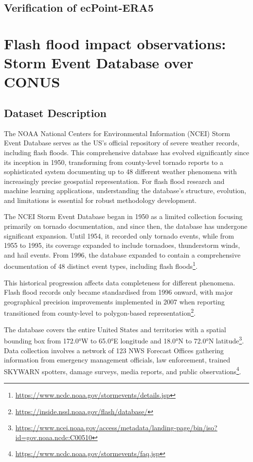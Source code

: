 \subsection{Verification of ecPoint-ERA5}



\section{Flash flood impact observations: Storm Event Database over CONUS}
\label{storm_event_database}

\subsection{Dataset Description}

The NOAA National Centers for Environmental Information (NCEI) Storm Event Database serves as the US's official repository of severe weather records, including flash floods. This comprehensive database has evolved significantly since its inception in 1950, transforming from county-level tornado reports to a sophisticated system documenting up to 48 different weather phenomena with increasingly precise geospatial representation. For flash flood research and machine learning applications, understanding the database's structure, evolution, and limitations is essential for robust methodology development. 

The NCEI Storm Event Database began in 1950 as a limited collection focusing primarily on tornado documentation, and since then, the database has undergone significant expansion. Until 1954, it recorded only tornado events, while from 1955 to 1995, its coverage expanded to include tornadoes, thunderstorm winds, and hail events. From 1996, the database expanded to contain a comprehensive documentation of 48 distinct event types, including flash floods\footnote{\url{https://www.ncdc.noaa.gov/stormevents/details.jsp}}. 

This historical progression affects data completeness for different phenomena. Flash flood records only became standardised from 1996 onward, with major geographical precision improvements implemented in 2007 when reporting transitioned from county-level to polygon-based representation\footnote{\url{https://inside.nssl.noaa.gov/flash/database/}}.

The database covers the entire United States and territories with a spatial bounding box from 172.0°W to 65.0°E longitude and 18.0°N to 72.0°N latitude\footnote{\url{https://www.ncei.noaa.gov/access/metadata/landing-page/bin/iso?id=gov.noaa.ncdc:C00510}}. Data collection involves a network of 123 NWS Forecast Offices gathering information from emergency management officials, law enforcement, trained SKYWARN spotters, damage surveys, media reports, and public observations\footnote{\url{https://www.ncdc.noaa.gov/stormevents/faq.jsp}}.

